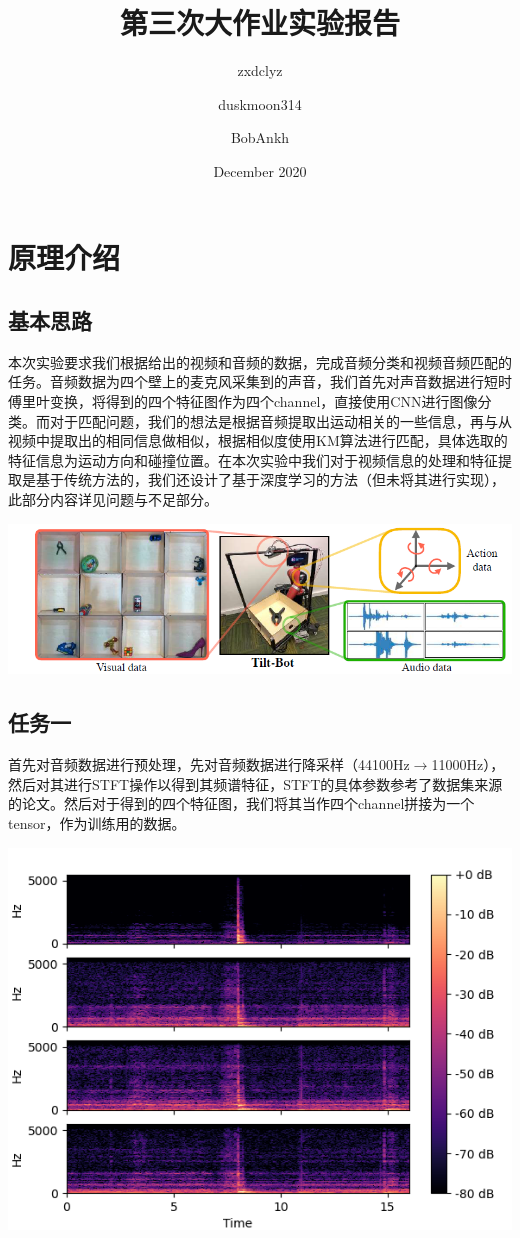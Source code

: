 \documentclass[a4paper]{ctexart}
\title{\textbf{第三次大作业实验报告}}
\author{
zxdclyz
\and
duskmoon314
\and
BobAnkh
}
\date{December 2020}
\begin{document}
\pagestyle{plain}

\maketitle

\section{原理介绍}
\subsection{基本思路}
本次实验要求我们根据给出的视频和音频的数据，完成音频分类和视频音频匹配的任务。音频数据为四个壁上的麦克风采集到的声音，我们首先对声音数据进行短时傅里叶变换，将得到的四个特征图作为四个channel，直接使用CNN进行图像分类。而对于匹配问题，我们的想法是根据音频提取出运动相关的一些信息，再与从视频中提取出的相同信息做相似，根据相似度使用KM算法进行匹配，具体选取的特征信息为运动方向和碰撞位置。在本次实验中我们对于视频信息的处理和特征提取是基于传统方法的，我们还设计了基于深度学习的方法（但未将其进行实现），此部分内容详见问题与不足部分。

\centerline{\includegraphics[scale=0.6]{images/dataset.png}}

\subsection{任务一}
首先对音频数据进行预处理，先对音频数据进行降采样（44100Hz$\rightarrow$11000Hz），然后对其进行STFT操作以得到其频谱特征，STFT的具体参数参考了数据集来源的论文\cite{gandhi2020swoosh}。然后对于得到的四个特征图，我们将其当作四个channel拼接为一个tensor，作为训练用的数据。

\centerline{\includegraphics[scale=0.5]{images/audio.png}}
\end{document}
